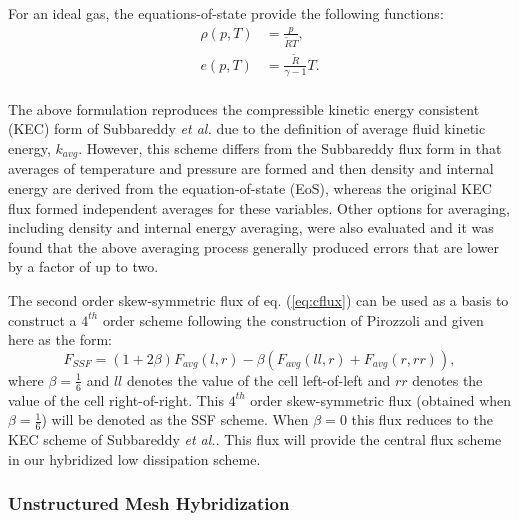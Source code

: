 For an ideal gas, the equations-of-state provide the following functions:
\begin{equation}
\begin{aligned}
\rho(p,T) &= \frac{p}{\tilde{R} T},\\
e(p,T) &= \frac{\tilde{R}}{\gamma-1} T.\\
\end{aligned}
\end{equation}

The above formulation reproduces the compressible kinetic energy
consistent (KEC) form of Subbareddy {\it et al.}\cite{Subbareddy.2009}
due to the definition of average fluid kinetic energy, $k_{avg}$.
However, this scheme differs from the Subbareddy flux form in that
averages of temperature and pressure are formed and then density and
internal energy are derived from the equation-of-state (EoS), whereas
the original KEC flux formed independent averages for these variables.
Other options for averaging, including density and internal energy
averaging, were also evaluated and it was found that the above
averaging process generally produced errors that are lower by a factor
of up to two.

The second order skew-symmetric flux of eq. (\ref{eq:cflux}) can
be used as a basis to construct a $4^{th}$ order scheme following the
construction of Pirozzoli\cite{Pirozzoli.2010,Pirozzoli.2011} and
given here as the form:
\begin{equation}
F_{SSF} = (1+2\beta)F_{avg}(l,r) - \beta\left(F_{avg}(ll,r)+F_{avg}(r,rr)\right),
\label{eq:fourth}
\end{equation}
where $\beta = \frac{1}{6}$ and $ll$ denotes the value of the cell
left-of-left and $rr$ denotes the value of the cell right-of-right.
This $4^{th}$ order skew-symmetric flux (obtained when
$\beta=\frac{1}{6}$) will be denoted as the SSF scheme.  When $\beta =
0$ this flux reduces to the KEC scheme of Subbareddy {\it et al.}.
This flux will provide the central flux scheme in our hybridized low
dissipation scheme.

\subsubsection{Unstructured Mesh Hybridization}

